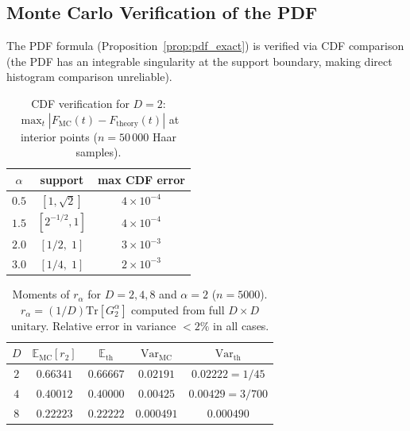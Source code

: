 \documentclass[12pt,a4paper]{article}
\begin{document}
\subsection{Monte Carlo Verification of the PDF}
\label{subsec:mc_pdf}

The PDF formula (Proposition~\ref{prop:pdf_exact}) is verified via CDF comparison
(the PDF has an integrable singularity at the support boundary, making direct histogram
comparison unreliable).

\begin{table}[h]
\centering
\caption{CDF verification for $D=2$: $\max_t|F_\mathrm{MC}(t)-F_\mathrm{theory}(t)|$
at interior points ($n=50\,000$ Haar samples).}
\label{tab:cdf_verify}
\begin{tabular}{c|c|c}
\hline
$\alpha$ & support & max CDF error \\
\hline
$0.5$ & $[1,\sqrt{2}]$ & $4\times10^{-4}$ \\
$1.5$ & $[2^{-1/2},1]$ & $4\times10^{-4}$ \\
$2.0$ & $[1/2,\;1]$ & $3\times10^{-3}$ \\
$3.0$ & $[1/4,\;1]$ & $2\times10^{-3}$ \\
\hline
\end{tabular}
\end{table}

\begin{table}[h]
\centering
\caption{Moments of $r_\alpha$ for $D=2,4,8$ and $\alpha=2$ ($n=5000$).
$r_\alpha=(1/D)\mathrm{Tr}[G_2^\alpha]$ computed from full $D\times D$ unitary.
Relative error in variance $<2\%$ in all cases.}
\label{tab:moments_D}
\begin{tabular}{c|cc|cc}
\hline
$D$ & $\mathbb{E}_\mathrm{MC}[r_2]$ & $\mathbb{E}_\mathrm{th}$ & $\mathrm{Var}_\mathrm{MC}$ & $\mathrm{Var}_\mathrm{th}$ \\
\hline
$2$ & $0.66341$ & $0.66667$ & $0.02191$ & $0.02222=1/45$ \\
$4$ & $0.40012$ & $0.40000$ & $0.00425$ & $0.00429=3/700$ \\
$8$ & $0.22223$ & $0.22222$ & $0.000491$ & $0.000490$ \\
\hline
\end{tabular}
\end{table}
\end{document}
